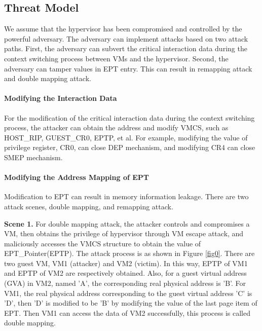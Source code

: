 \documentclass[conference]{IEEEtran}
\begin{document}
\subsection{Threat Model} \label {threat}



We assume that the hypervisor has been compromised and controlled by the powerful adversary. The adversary can implement attacks based on two attack paths. 
First, the adversary can subvert the critical interaction data during the context switching process between VMs and the hypervisor. Second, the adversary can tamper values in EPT entry. This can result in remapping attack and double mapping attack.

\paragraph{Modifying the Interaction Data}
For the modification of the critical interaction data during the context switching process, the attacker can obtain the address 
and modify VMCS, such as HOST\_RIP, GUEST\_CR0, EPTP, et al. For example,
modifying the value of privilege register, CR0, can close DEP mechanism, and modifying CR4 can close SMEP mechanism.

\paragraph{Modifying the Address Mapping of EPT}
Modification to EPT can result in memory information leakage. There are two attack scenes, double mapping, and remapping attack.

\textbf{Scene 1.} 
    For double mapping attack, the attacker controls and compromises a VM, then obtains the privilege of hypervisor through VM escape attack, and maliciously accesses the VMCS structure to obtain the value of EPT\_Pointer(EPTP). The attack process is as shown in Figure \ref{fig0}. There are two guest VM, VM1 (attacker) and VM2 (victim). In this way, EPTP of VM1 and EPTP of VM2 are respectively obtained. Also, for a guest virtual address (GVA) in VM2, named 'A', the corresponding real physical address is 'B'. For VM1, the real physical address corresponding to the guest virtual address 'C' is 'D', then 'D' is modified to be 'B' by modifying the value of the last page item of EPT. Then VM1 can access the data of VM2 successfully, this process is called double mapping.
\end{document}
